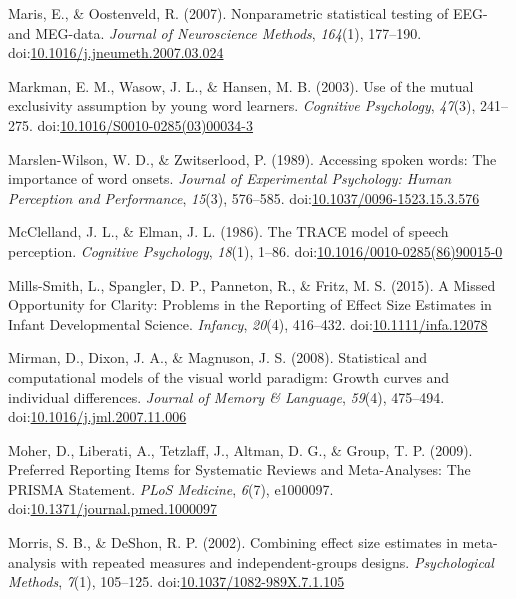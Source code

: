 \documentclass[man]{apa6}
\begin{document}
\leavevmode\hypertarget{ref-Maris2007}{}%
Maris, E., \& Oostenveld, R. (2007). Nonparametric statistical testing of EEG- and MEG-data. \emph{Journal of Neuroscience Methods}, \emph{164}(1), 177--190. doi:\href{https://doi.org/10.1016/j.jneumeth.2007.03.024}{10.1016/j.jneumeth.2007.03.024}

\leavevmode\hypertarget{ref-Markman2003}{}%
Markman, E. M., Wasow, J. L., \& Hansen, M. B. (2003). Use of the mutual exclusivity assumption by young word learners. \emph{Cognitive Psychology}, \emph{47}(3), 241--275. doi:\href{https://doi.org/10.1016/S0010-0285(03)00034-3}{10.1016/S0010-0285(03)00034-3}

\leavevmode\hypertarget{ref-Marslen-Wilson1989}{}%
Marslen-Wilson, W. D., \& Zwitserlood, P. (1989). Accessing spoken words: The importance of word onsets. \emph{Journal of Experimental Psychology: Human Perception and Performance}, \emph{15}(3), 576--585. doi:\href{https://doi.org/10.1037/0096-1523.15.3.576}{10.1037/0096-1523.15.3.576}

\leavevmode\hypertarget{ref-McClelland1986}{}%
McClelland, J. L., \& Elman, J. L. (1986). The TRACE model of speech perception. \emph{Cognitive Psychology}, \emph{18}(1), 1--86. doi:\href{https://doi.org/10.1016/0010-0285(86)90015-0}{10.1016/0010-0285(86)90015-0}

\leavevmode\hypertarget{ref-Mills-Smith2015}{}%
Mills-Smith, L., Spangler, D. P., Panneton, R., \& Fritz, M. S. (2015). A Missed Opportunity for Clarity: Problems in the Reporting of Effect Size Estimates in Infant Developmental Science. \emph{Infancy}, \emph{20}(4), 416--432. doi:\href{https://doi.org/10.1111/infa.12078}{10.1111/infa.12078}

\leavevmode\hypertarget{ref-Mirman2008}{}%
Mirman, D., Dixon, J. A., \& Magnuson, J. S. (2008). Statistical and computational models of the visual world paradigm: Growth curves and individual differences. \emph{Journal of Memory \& Language}, \emph{59}(4), 475--494. doi:\href{https://doi.org/10.1016/j.jml.2007.11.006}{10.1016/j.jml.2007.11.006}

\leavevmode\hypertarget{ref-Moher2009}{}%
Moher, D., Liberati, A., Tetzlaff, J., Altman, D. G., \& Group, T. P. (2009). Preferred Reporting Items for Systematic Reviews and Meta-Analyses: The PRISMA Statement. \emph{PLoS Medicine}, \emph{6}(7), e1000097. doi:\href{https://doi.org/10.1371/journal.pmed.1000097}{10.1371/journal.pmed.1000097}

\leavevmode\hypertarget{ref-morris2002combining}{}%
Morris, S. B., \& DeShon, R. P. (2002). Combining effect size estimates in meta-analysis with repeated measures and independent-groups designs. \emph{Psychological Methods}, \emph{7}(1), 105--125. doi:\href{https://doi.org/10.1037/1082-989X.7.1.105}{10.1037/1082-989X.7.1.105}
\end{document}

